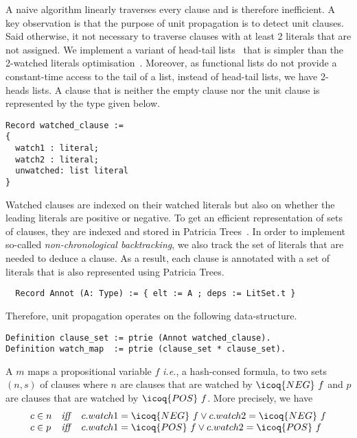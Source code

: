 \documentclass[a4paper,UKenglish,cleveref, autoref, thm-restate]{lipics-v2019}
\begin{document}
A naive algorithm linearly traverses every clause and is therefore inefficient.
%
A key observation is that the purpose of unit propagation is
to detect unit clauses. Said otherwise, it not necessary to traverse
clauses with at least 2 literals that are not assigned.
%
We implement a variant of head-tail
lists~\cite{Zhang96anefficient,ZhangS00} that is simpler than the
2-watched literals optimisation~\cite{MoskewiczMZZM01}.
%
Moreover, as functional lists do not provide a constant-time access to the
tail of a list, instead of head-tail lists, we have 2-heads lists.
%
A clause that is neither the empty clause nor the unit clause is
represented by the type  given below.
\begin{verbatim}
Record watched_clause :=
{
  watch1 : literal;
  watch2 : literal;
  unwatched: list literal
}
\end{verbatim}
Watched clauses are indexed on their watched literals but also on whether the leading literals are positive or negative.
%
To get an efficient representation of sets of clauses, they are indexed and stored in Patricia Trees~\cite{Okasaki98fastmergeable}. 
%
In order to implement so-called \emph{non-chronological backtracking},
we also track the set of literals that are needed to deduce a clause. As a
result, each clause is annotated  with a set of literals  that is also
represented using Patricia Trees.
\begin{verbatim}
  Record Annot (A: Type) := { elt := A ; deps := LitSet.t }
\end{verbatim}
Therefore, unit propagation
operates on the following  data-structure.
\begin{verbatim}
Definition clause_set := ptrie (Annot watched_clause).
Definition watch_map  := ptrie (clause_set * clause_set).
\end{verbatim}
A  $m$ maps a propositional variable $f$ \emph{i.e.},
a hash-consed formula, to two sets $(n,s)$ of clauses where $n$ are
clauses that are watched by $\icoq{NEG}\ f$ and $p$ are clauses that
are watched  by $\icoq{POS}\ f$. More precisely, we have
\[
  \begin{array}{lcl}
    c \in n &\mathit{ iff }& c.watch1=\icoq{NEG}\ f \lor c.watch2=\icoq{NEG}\ f \\
    c \in p &\mathit{ iff }& c.watch1=\icoq{POS}\ f \lor c.watch2=\icoq{POS}\ f \\
  \end{array}
\]
\end{document}
